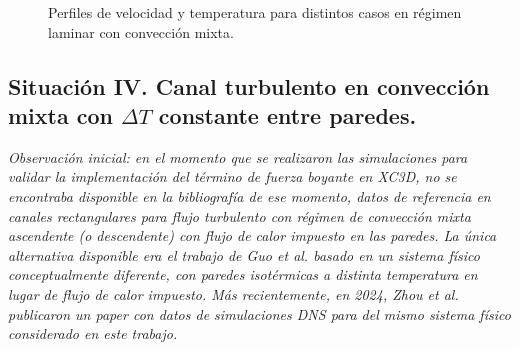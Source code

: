 \begin{figure}[H]
 \centering
 \caption{Perfiles de velocidad y temperatura para distintos casos en régimen laminar con convección mixta.} 
 \label{fig:chen-profiles}
\end{figure}


\subsection{Situación IV. Canal turbulento en convección mixta con $\Delta T$ constante entre paredes.}

\textit{Observación inicial: en el momento que se realizaron las simulaciones para validar la implementación del término de fuerza boyante en XC3D, no se encontraba disponible en la bibliografía de ese momento, datos de referencia en canales rectangulares para flujo turbulento con régimen de convección mixta ascendente (o descendente) con flujo de calor impuesto en las paredes. La única alternativa disponible era el trabajo de Guo \textit{et al.} \cite{guo2022direct} basado en un sistema físico conceptualmente diferente, con paredes isotérmicas a distinta temperatura en lugar de flujo de calor impuesto. Más recientemente, en 2024, Zhou \textit{et al.} publicaron un \textit{paper} \cite{zhou2024direct} con datos de simulaciones DNS para del mismo sistema físico considerado en este trabajo.} 




